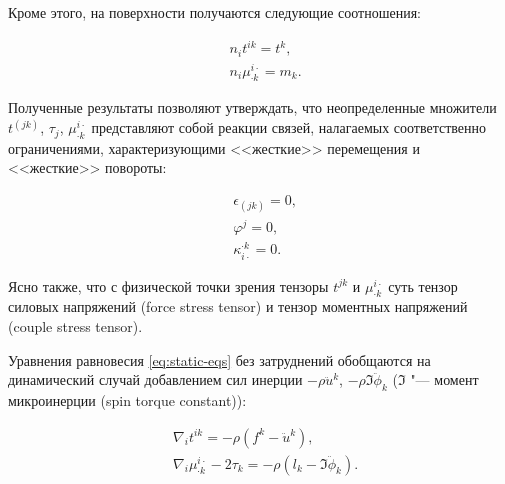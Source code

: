 Кроме этого,  на поверхности получаются следующие соотношения:

\begin{equation}

\begin{aligned}

&n_it^{ik}=t^k,\\

&n_i\mu^{i\cdot}_{\cdot k}=m_k.

\label{eq:surface-s-cs}

\end{aligned}

\end{equation}



Полученные результаты позволяют утверждать, что неопределенные множители \(t^{(jk)}\), \(\tau_j\), \(\mu^{i\cdot}_{\cdot k}\) представляют собой реакции связей, налагаемых соответственно ограничениями, характеризующими <<жесткие>> перемещения и <<жесткие>> повороты:

\begin{equation}

\begin{aligned}

&\epsilon_{(jk)}=0,\\

&\varphi^j=0,\\

&\kappa_{i\cdot}^{\cdot k}=0.

\end{aligned}

\end{equation}

Ясно также, что с физической точки зрения тензоры \(t^{jk}\) и \(\mu^{i\cdot}_{\cdot k}\) суть тензор силовых напряжений (force stress tensor) и тензор моментных напряжений (couple stress tensor).



Уравнения равновесия \eqref{eq:static-eqs} без затруднений обобщаются на динамический случай добавлением сил инерции \(-\rho{\ddot u^k}\), \(-\rho{\mathfrak I}{\ddot\phi_k}\) (\({\mathfrak I}\) "--- момент микроинерции (spin torque constant)): 

\begin{equation}

\begin{aligned}

&\nabla_it^{ik}=-\rho(f^k-{\ddot u^k}),\\

&\nabla_i\mu^{i\cdot}_{\cdot k}-2\tau_k=-\rho(l_k-{\mathfrak I}{\ddot\phi_k}).

\label{eq:dynamic-eqs}

\end{aligned}

\end{equation}



